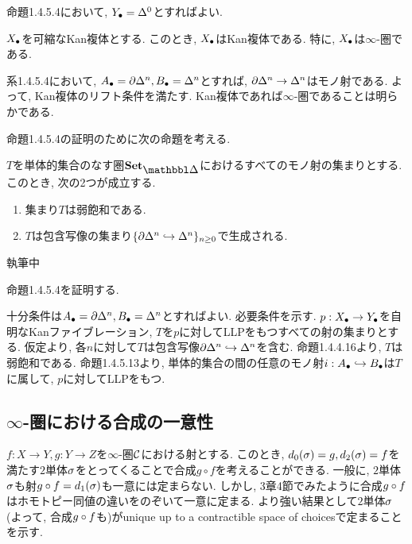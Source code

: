 \documentclass[uplatex, a4paper, 14Q, dvipdfmx]{jsreport}
\begin{document}
\begin{Proof}
  命題1.4.5.4において, $Y_\bullet=\Delta^0$とすればよい. 
\end{Proof}

\begin{cor}
  $X_\bullet$を可縮なKan複体とする.
  このとき, $X_\bullet$はKan複体である.
  特に, $X_\bullet$は$\infty$-圏である. 
\end{cor}

\begin{Proof}
  系1.4.5.4において, $A_\bullet=\partial \Delta^n, B_\bullet=\Delta^n$とすれば, $\partial \Delta^n \to \Delta^n$はモノ射である. 
  よって, Kan複体のリフト条件を満たす. 
  Kan複体であれば$\infty$-圏であることは明らかである. 
\end{Proof}

命題1.4.5.4の証明のために次の命題を考える. 

\begin{prop}
  $T$を単体的集合のなす圏$\sset$におけるすべてのモノ射の集まりとする. 
  このとき, 次の2つが成立する. 
  \begin{enumerate}
    \item 集まり$T$は弱飽和である.
    \item $T$は包含写像の集まり$\{\partial \Delta^n \hookrightarrow \Delta^n\}_{n \geq 0}$で生成される. 
  \end{enumerate}
\end{prop}

\begin{Proof}
  執筆中
\end{Proof}

命題1.4.5.4を証明する.

\begin{Proof}
  十分条件は$A_\bullet=\partial \Delta^n, B_\bullet=\Delta^n$とすればよい. 
  必要条件を示す. 
  $p: X_\bullet \to Y_\bullet$を自明なKanファイブレーション, $T$を$p$に対してLLPをもつすべての射の集まりとする.
  仮定より, 各$n$に対して$T$は包含写像$\partial \Delta^n \hookrightarrow \Delta^n$を含む. 
  命題1.4.4.16より, $T$は弱飽和である. 
  命題1.4.5.13より, 単体的集合の間の任意のモノ射$i: A_\bullet \hookrightarrow B_\bullet$は$T$に属して, $p$に対してLLPをもつ.
\end{Proof}

\subsection{\texorpdfstring{$\infty$}{infty}-圏における合成の一意性}

$f: X \to Y, g: Y \to Z$を$\infty$-圏$\mathcal{C}$における射とする. 
このとき, $d_0(\sigma)=g, d_2(\sigma)=f$を満たす$2$単体$\sigma$をとってくることで合成$g \circ f$を考えることができる. 
一般に, $2$単体$\sigma$も射$g \circ f = d_1(\sigma)$も一意には定まらない. 
しかし, 3章4節でみたように合成$g \circ f$はホモトピー同値の違いをのぞいて一意に定まる.
より強い結果として$2$単体$\sigma$ (よって, 合成$g \circ f$も)がunique up to a contractible space of choicesで定まることを示す.
\end{document}
